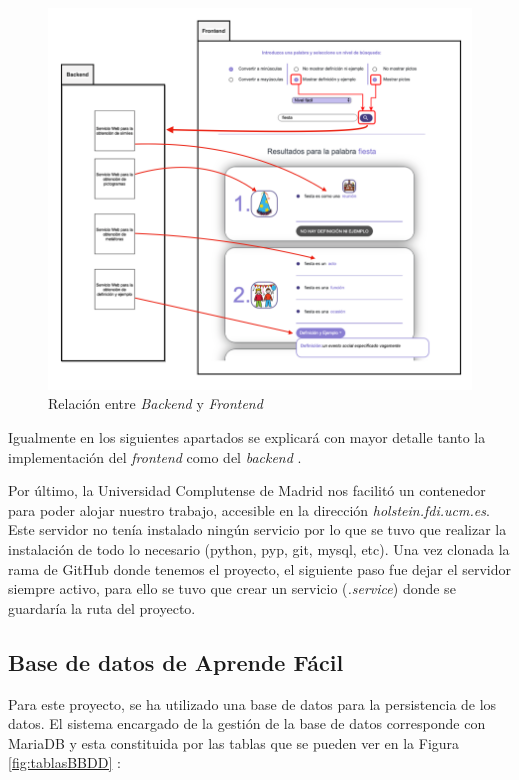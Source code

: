 \begin{figure}[!h]
	\includegraphics[width=1.2\textwidth]{Imagenes/Bitmap/Capitulo4/RelacionBackFront.png}
	\centering
	\caption{Relación entre \textit{Backend} y \textit{Frontend}}
	\label{fig:relacionBackFront}
\end{figure}


 Igualmente en los siguientes apartados se explicará con mayor detalle tanto la implementación del \textit{frontend} como del \textit{backend} . 

Por último, la Universidad Complutense de Madrid nos facilitó un contenedor para poder alojar nuestro trabajo, accesible en la dirección \textit{holstein.fdi.ucm.es}. Este servidor no tenía instalado ningún servicio por lo que se tuvo que realizar la instalación de todo lo necesario (python, pyp, git, mysql, etc). Una vez clonada la rama de GitHub donde tenemos el proyecto, el siguiente paso fue dejar el servidor siempre activo, para ello se tuvo que crear un servicio (\textit{.service}) donde se guardaría la ruta del proyecto.

\subsection{Base de datos de Aprende Fácil}

Para este proyecto, se ha utilizado una base de datos para la persistencia de los datos. El sistema encargado de la gestión de la base de datos corresponde con MariaDB y esta constituida por las tablas que se pueden ver en la Figura \ref{fig:tablasBBDD} :

